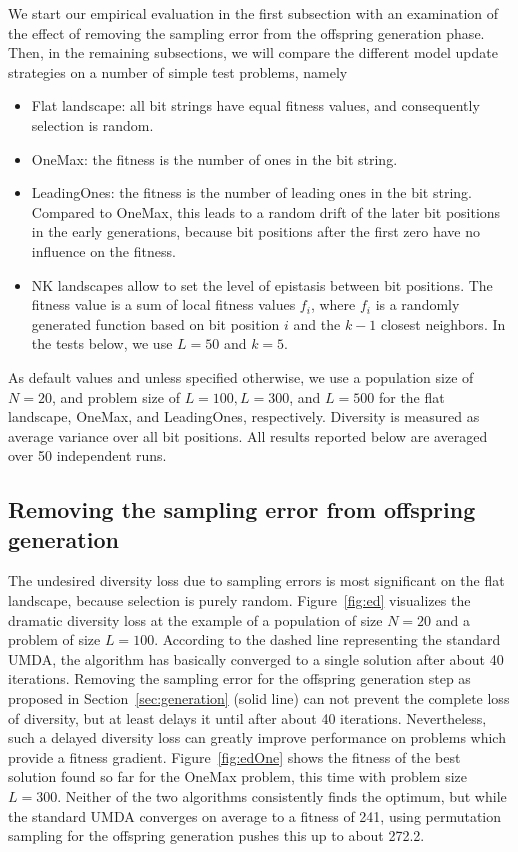 \documentclass{acm_proc_article-sp}
\newcommand{\Np}{N}
\begin{document}
We start our empirical evaluation in the first subsection with an examination of 
the effect of removing the sampling error
from the offspring generation phase. Then, in the remaining subsections, we will compare
the different model update strategies on a number of simple test problems,
namely 
\begin{itemize}
\item Flat landscape: all bit strings have equal fitness values, and consequently
selection is random.
\item OneMax: the fitness is the number of ones in the bit string.
\item LeadingOnes: the fitness is the number of leading ones in the bit string. Compared to
OneMax, this leads to a random drift of the later bit positions in the early generations, because
bit positions after the first zero have no influence on the fitness.
\item NK landscapes allow to set the level
of epistasis between bit positions. The fitness value is a sum of local fitness values $f_i$,
where $f_i$ is a randomly generated function based on bit position $i$ and the $k-1$ closest neighbors. 
In the tests below, we use $L=50$ and $k=5$.
\end{itemize}

As default values and unless specified otherwise, we use a population size of $\Np=20$, and problem size of $L=100, L=300$, and $L=500$ for the flat landscape, OneMax, and LeadingOnes, respectively.
Diversity is measured as
average variance over all bit positions.
All results reported below are averaged over 50 independent runs. 

\subsection{Removing the sampling error from offspring generation}
\label{sec:exactDistribution}

The undesired diversity loss due to sampling errors is most
significant on the flat landscape, because selection is purely
random. Figure~\ref{fig:ed} visualizes the dramatic diversity loss at
the example of a population of size $\Np=20$ and a problem of size $L=100$. 
According to the dashed line representing the standard UMDA, the
algorithm has basically converged to a single solution after about 40
iterations. Removing the sampling error for the offspring generation
step as proposed in Section~\ref{sec:generation} (solid line) can
not prevent the complete loss of diversity, but at least delays
it until after about 40 iterations. Nevertheless, such a delayed diversity
loss can greatly improve performance on problems which provide a fitness
gradient. Figure~\ref{fig:edOne} shows the fitness of the best solution
found so far for the OneMax problem, this time with problem size $L=300$. 
Neither of the two algorithms consistently finds
the optimum, but while the standard UMDA converges on average to a fitness of
241, using permutation sampling for the offspring generation pushes this
up to about 272.2.
\end{document}
